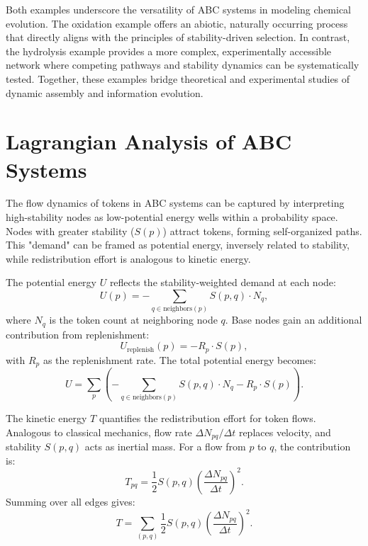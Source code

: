 \documentclass[entropy,article,submit,pdftex,oneauthor]{Definitions/mdpi}
\begin{document}
Both examples underscore the versatility of ABC systems in modeling chemical evolution. The oxidation example offers an abiotic, naturally occurring process that directly aligns with the principles of stability-driven selection. In contrast, the hydrolysis example provides a more complex, experimentally accessible network where competing pathways and stability dynamics can be systematically tested. Together, these examples bridge theoretical and experimental studies of dynamic assembly and information evolution.


\section{Lagrangian Analysis of ABC Systems}

The flow dynamics of tokens in ABC systems can be captured by interpreting high-stability nodes as low-potential energy wells within a probability space. Nodes with greater stability (\( S(p) \)) attract tokens, forming self-organized paths. This "demand" can be framed as potential energy, inversely related to stability, while redistribution effort is analogous to kinetic energy.

The potential energy \( U \) reflects the stability-weighted demand at each node:
\begin{equation}
U(p) = -\sum_{q \in \text{neighbors}(p)} S(p, q) \cdot N_q,
\end{equation}
where \( N_q \) is the token count at neighboring node \( q \). Base nodes gain an additional contribution from replenishment:
\begin{equation}
U_{\text{replenish}}(p) = -R_p \cdot S(p),
\end{equation}
with \( R_p \) as the replenishment rate. The total potential energy becomes:
\begin{equation}
U = \sum_{p} \left( -\sum_{q \in \text{neighbors}(p)} S(p, q) \cdot N_q - R_p \cdot S(p) \right).
\end{equation}

The kinetic energy \( T \) quantifies the redistribution effort for token flows. Analogous to classical mechanics, flow rate \( \Delta N_{pq} / \Delta t \) replaces velocity, and stability \( S(p, q) \) acts as inertial mass. For a flow from \( p \) to \( q \), the contribution is:
\begin{equation}
T_{pq} = \frac{1}{2} S(p, q) \left( \frac{\Delta N_{pq}}{\Delta t} \right)^2.
\end{equation}
Summing over all edges gives:
\begin{equation}
T = \sum_{(p, q)} \frac{1}{2} S(p, q) \left( \frac{\Delta N_{pq}}{\Delta t} \right)^2.
\end{equation}
\end{document}
